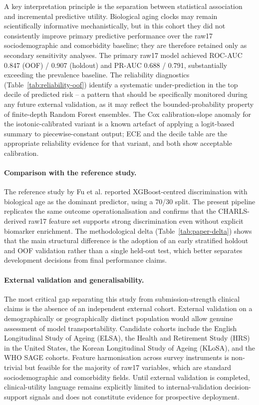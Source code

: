 \documentclass[11pt,a4paper]{article}
\begin{document}
A key interpretation principle is the separation between statistical association and incremental predictive utility. Biological aging clocks may remain scientifically informative mechanistically, but in this cohort they did not consistently improve primary predictive performance over the raw17 sociodemographic and comorbidity baseline; they are therefore retained only as secondary sensitivity analyses. The primary raw17 model achieved ROC-AUC 0.847 (OOF) / 0.907 (holdout) and PR-AUC 0.688 / 0.791, substantially exceeding the prevalence baseline. The reliability diagnostics (Table~\ref{tab:reliability-oof}) identify a systematic under-prediction in the top decile of predicted risk -- a pattern that should be specifically monitored during any future external validation, as it may reflect the bounded-probability property of finite-depth Random Forest ensembles\cite{NiculescuMizil2005}. The Cox calibration-slope anomaly for the isotonic-calibrated variant is a known artefact of applying a logit-based summary to piecewise-constant output\cite{NiculescuMizil2005,VanCalster2019}; ECE and the decile table are the appropriate reliability evidence for that variant, and both show acceptable calibration.

\paragraph{Comparison with the reference study.} The reference study by Fu et al.\cite{Fu2025} reported XGBoost-centred discrimination with biological age as the dominant predictor, using a 70/30 split. The present pipeline replicates the same outcome operationalisation and confirms that the CHARLS-derived raw17 feature set supports strong discrimination even without explicit biomarker enrichment. The methodological delta (Table~\ref{tab:paper-delta}) shows that the main structural difference is the adoption of an early stratified holdout and OOF validation rather than a single held-out test, which better separates development decisions from final performance claims.

\paragraph{External validation and generalisability.} The most critical gap separating this study from submission-strength clinical claims is the absence of an independent external cohort. External validation on a demographically or geographically distinct population would allow genuine assessment of model transportability\cite{Steyerberg2019}. Candidate cohorts include the English Longitudinal Study of Ageing (ELSA), the Health and Retirement Study (HRS) in the United States, the Korean Longitudinal Study of Ageing (KLoSA), and the WHO SAGE cohorts. Feature harmonisation across survey instruments is non-trivial but feasible for the majority of raw17 variables, which are standard sociodemographic and comorbidity fields. Until external validation is completed, clinical-utility language remains explicitly limited to internal-validation decision-support signals and does not constitute evidence for prospective deployment.
\end{document}
